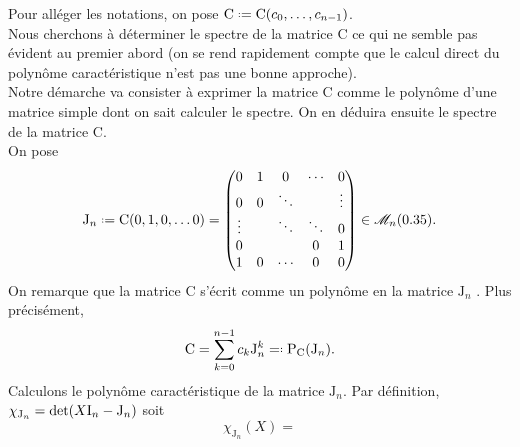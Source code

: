 \begin{preuve}
    Pour alléger les notations, on pose $\mathrm{C} \defeq \mathrm{C}(c_0, \dots, c_{n-1})$. \\
    Nous cherchons à déterminer le spectre de la matrice $\mathrm{C}$ ce qui ne semble pas évident au premier abord (on se rend rapidement compte que le calcul direct du polynôme caractéristique n'est pas une bonne approche). \\
    Notre démarche va consister à exprimer la matrice $\mathrm{C}$ comme le polynôme d'une matrice simple dont on sait calculer le spectre. On en déduira ensuite le spectre de la matrice $\mathrm{C}$. \\
    On pose 
    $$
    \mathrm{J}_n \defeq \mathrm{C}(0, 1, 0, \dots 0) = 
    \begin{pmatrix}
    0 & 1 & 0 & \cdots & 0 \\
    0 & 0 & \ddots & & \vdots \\
    \vdots & & \ddots & \ddots & 0 \\
    0 & & & 0 & 1 \\
    1 & 0 & \cdots & 0 & 0
    \end{pmatrix} \in \M_n(\R).
    $$
    On remarque que la matrice $\mathrm{C}$ s'écrit comme un polynôme en la matrice $\mathrm{J}_n$ \note. Plus précisément, 
    $$\mathrm{C} = \sum_{k=0}^{n-1} c_k \mathrm{J}_n^k \defeqright \mathrm{P}_{\mathrm{C}}(\mathrm{J}_n).$$
    Calculons le polynôme caractéristique de la matrice $\mathrm{J}_n$. Par définition, $\chi_{\mathrm{J}_n} = \det(X \mathrm{I}_n - \mathrm{J}_n)$ soit 
    $$
        \chi_{\mathrm{J}_n}(X) = 
$$
\end{preuve}
